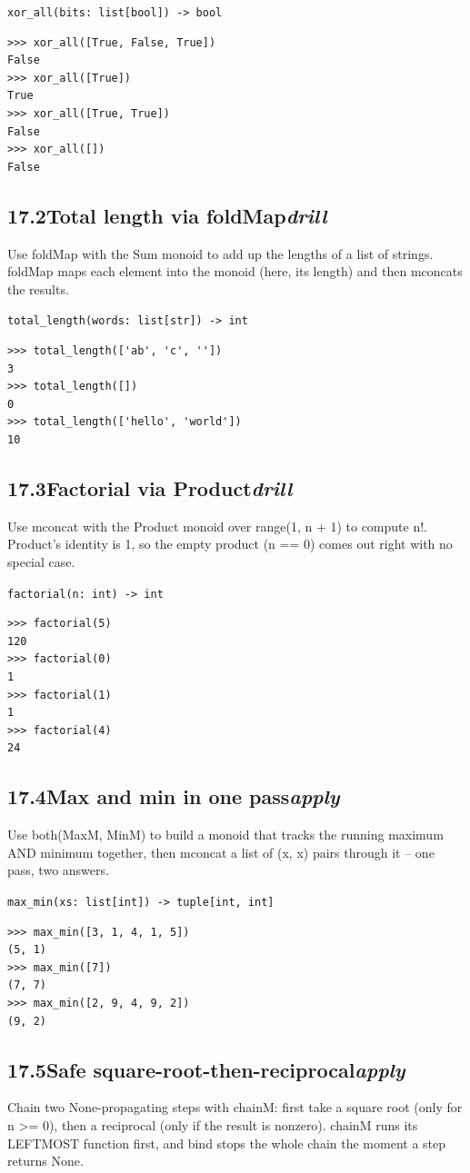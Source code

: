 \documentclass[10pt,letterpaper]{book}
\begin{document}
\noindent\texttt{xor\_all(bits: list[bool]) -> bool}
\begin{lstlisting}[style=ex]
>>> xor_all([True, False, True])
False
>>> xor_all([True])
True
>>> xor_all([True, True])
False
>>> xor_all([])
False
\end{lstlisting}
\subsection*{17.2\quad Total length via foldMap\hfill\textnormal{\textit{drill}}}
Use foldMap with the Sum monoid to add up the lengths of a list of strings. foldMap maps each element into the monoid (here, its length) and then mconcats the results.

\noindent\texttt{total\_length(words: list[str]) -> int}
\begin{lstlisting}[style=ex]
>>> total_length(['ab', 'c', ''])
3
>>> total_length([])
0
>>> total_length(['hello', 'world'])
10
\end{lstlisting}
\subsection*{17.3\quad Factorial via Product\hfill\textnormal{\textit{drill}}}
Use mconcat with the Product monoid over range(1, n + 1) to compute n!. Product's identity is 1, so the empty product (n == 0) comes out right with no special case.

\noindent\texttt{factorial(n: int) -> int}
\begin{lstlisting}[style=ex]
>>> factorial(5)
120
>>> factorial(0)
1
>>> factorial(1)
1
>>> factorial(4)
24
\end{lstlisting}
\subsection*{17.4\quad Max and min in one pass\hfill\textnormal{\textit{apply}}}
Use both(MaxM, MinM) to build a monoid that tracks the running maximum AND minimum together, then mconcat a list of (x, x) pairs through it -- one pass, two answers.

\noindent\texttt{max\_min(xs: list[int]) -> tuple[int, int]}
\begin{lstlisting}[style=ex]
>>> max_min([3, 1, 4, 1, 5])
(5, 1)
>>> max_min([7])
(7, 7)
>>> max_min([2, 9, 4, 9, 2])
(9, 2)
\end{lstlisting}
\subsection*{17.5\quad Safe square-root-then-reciprocal\hfill\textnormal{\textit{apply}}}
Chain two None-propagating steps with chainM: first take a square root (only for n >= 0), then a reciprocal (only if the result is nonzero). chainM runs its LEFTMOST function first, and bind stops the whole chain the moment a step returns None.
\end{document}
